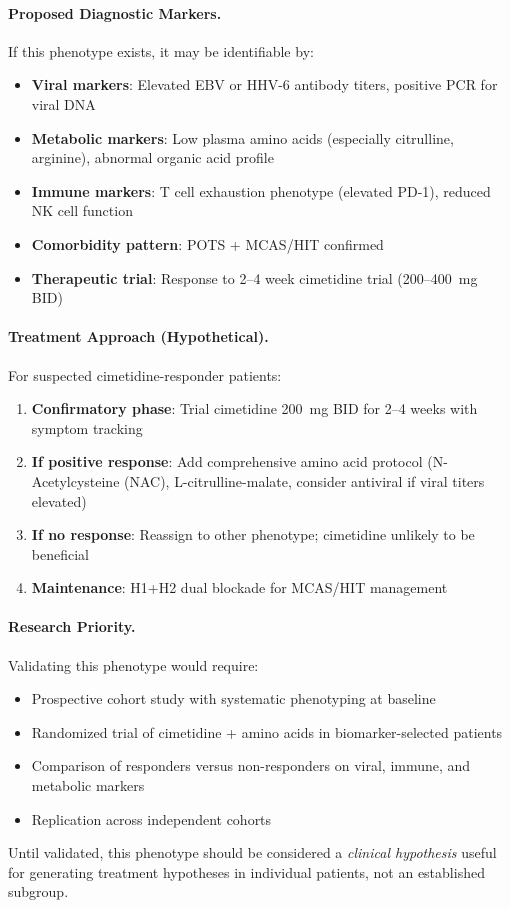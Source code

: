 \paragraph{Proposed Diagnostic Markers.}
If this phenotype exists, it may be identifiable by:
\begin{itemize}
    \item \textbf{Viral markers}: Elevated EBV or HHV-6 antibody titers, positive PCR for viral DNA
    \item \textbf{Metabolic markers}: Low plasma amino acids (especially citrulline, arginine), abnormal organic acid profile
    \item \textbf{Immune markers}: T cell exhaustion phenotype (elevated PD-1), reduced NK cell function
    \item \textbf{Comorbidity pattern}: POTS + MCAS/HIT confirmed
    \item \textbf{Therapeutic trial}: Response to 2--4 week cimetidine trial (200--400~mg BID)
\end{itemize}

\paragraph{Treatment Approach (Hypothetical).}
For suspected cimetidine-responder patients:
\begin{enumerate}
    \item \textbf{Confirmatory phase}: Trial cimetidine 200~mg BID for 2--4 weeks with symptom tracking
    \item \textbf{If positive response}: Add comprehensive amino acid protocol (N-Acetylcysteine (NAC), L-citrulline-malate, consider antiviral if viral titers elevated)
    \item \textbf{If no response}: Reassign to other phenotype; cimetidine unlikely to be beneficial
    \item \textbf{Maintenance}: H1+H2 dual blockade for MCAS/HIT management
\end{enumerate}

\paragraph{Research Priority.}
Validating this phenotype would require:
\begin{itemize}
    \item Prospective cohort study with systematic phenotyping at baseline
    \item Randomized trial of cimetidine + amino acids in biomarker-selected patients
    \item Comparison of responders versus non-responders on viral, immune, and metabolic markers
    \item Replication across independent cohorts
\end{itemize}

Until validated, this phenotype should be considered a \textit{clinical hypothesis} useful for generating treatment hypotheses in individual patients, not an established subgroup.

